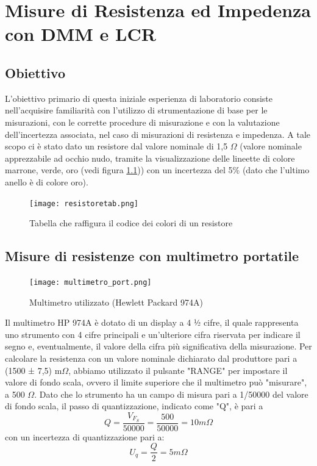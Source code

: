 \chapter{Misure di Resistenza ed Impedenza con DMM e LCR}
\label{chap:prima_prova}


\section*{Obiettivo}
\label{sec:ob_first}

L'obiettivo primario di questa iniziale esperienza di laboratorio consiste nell'acquisire familiarità con l'utilizzo di strumentazione di base per le misurazioni, con le corrette procedure di misurazione e con la valutazione dell'incertezza associata, nel caso di misurazioni di resistenza e impedenza.
\newline \newline
A tale scopo ci è stato dato un resistore dal valore nominale di 1,5 $\Omega$ (valore nominale apprezzabile ad occhio nudo, tramite la visualizzazione delle lineette di colore marrone, verde, oro (vedi figura \ref{fig:resistore})) con un incertezza del 5\% (dato che l'ultimo anello è di colore oro).

\begin{figure}[h]
    \centering
    \texttt{[image: resistoretab.png]}
    \caption{Tabella che raffigura il codice dei colori di un resistore}
    \label{fig:resistore}
\end{figure}
\FloatBarrier
\clearpage




\section{Misure di resistenze con multimetro portatile}
\label{sec:mult_port}

\begin{figure}[h]
    \centering
    \texttt{[image: multimetro\_port.png]}
    \caption{Multimetro utilizzato (Hewlett Packard 974A)}
    \label{fig:multimetro_port}
\end{figure}
\FloatBarrier

Il multimetro HP 974A è dotato di un display a 4 ½ cifre, il quale rappresenta uno strumento con 4 cifre principali e un'ulteriore cifra riservata per indicare il segno e, eventualmente, il valore della cifra più significativa della misurazione. Per calcolare la resistenza con un valore nominale dichiarato dal produttore pari a (1500 ± 7,5) m$\Omega$, abbiamo utilizzato il pulsante "RANGE" per impostare il valore di fondo scala, ovvero il limite superiore che il multimetro può "misurare", a 500 $\Omega$. Dato che lo strumento ha un campo di misura pari a 1/50000 del valore di fondo scala, il passo di quantizzazione, indicato come "Q", è pari a
\begin{equation}
    Q = \frac{V_{F_S}}{50000} = \frac{500}{50000} = 10 m\Omega
\end{equation}
con un incertezza di quantizzazione pari a: 
\begin{equation}
    U_q = \frac{Q}{2} = 5 m\Omega
\end{equation}

